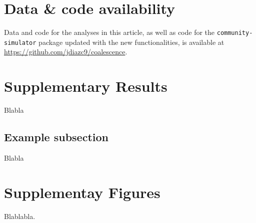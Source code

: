 \documentclass[a4paper,10pt]{article}
\begin{document}
\clearpage

\section{Data \& code availability}
\label{supp-datacode}

Data and code for the analyses in this article, as well as code for the
\texttt{community-simulator} package updated with the new functionalities,
is available at \url{https://github.com/jdiazc9/coalescence}.

\clearpage

\section{Supplementary Results}\label{supp-results}

Blabla

\subsection{Example subsection}
\label{supp-results:example}

Blabla

\clearpage

\section{Supplementay Figures}\label{supp-figs}

Blablabla.

\clearpage


%

\end{document}
